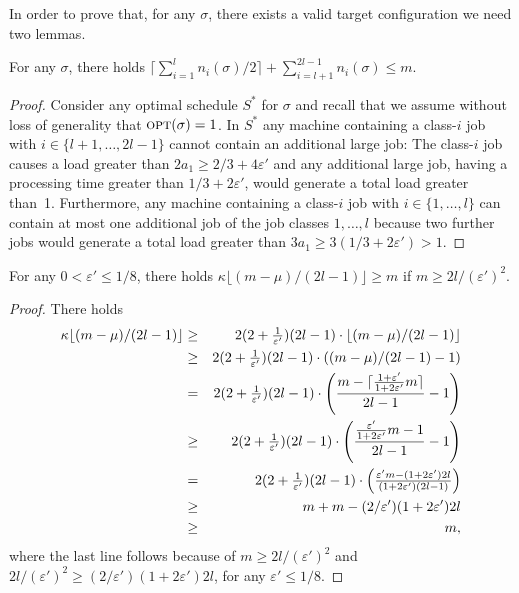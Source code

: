 \documentclass{llncs}
\newcommand{\OPT}{\text{{\sc opt}}}
\newcommand{\opt}{\OPT}
\newcommand{\eps}{\varepsilon}
\begin{document}
In order to prove that, for any $\sigma$, there exists a valid target configuration we need two lemmas.
\begin{lemma}\label{lem:jobs}
For any $\sigma$, there holds $\lceil \sum_{i=1}^l n_i(\sigma) / 2 \rceil + \sum_{i=l+1}^{2l-1} n_i(\sigma) \leq m$. 
\end{lemma}
\begin{proof}
Consider any optimal schedule $S^*$ for $\sigma$ and recall that we assume without loss of generality that
$\opt(\sigma)=1$. In $S^*$ any machine containing a class-$i$ job with $i\in \{l+1, \ldots, 2l-1\}$ cannot
contain an additional large job: The class-$i$ job causes a load greater than $2a_1 \geq 2/3+4\eps'$ and
any additional large job, having a processing time greater than $1/3+2\eps'$, would generate a total load
greater than~1. Furthermore, any machine containing a class-$i$ job with $i\in \{1,\ldots, l\}$ can
contain at most one additional job of the job classes $1, \ldots, l$ because two further jobs 
would generate a total load greater than $3a_1 \geq 3(1/3+2\eps') >1$. \hspace*{\fill}{$\Box$}
\end{proof}

\begin{lemma}\label{lem:kappa}
For any $0<\eps'\leq 1/8$, there holds $\kappa \lfloor (m-\mu)/(2l-1)\rfloor \geq m$ if $m\geq 2l/(\eps')^2$. 
\end{lemma}
\begin{proof}
There holds
\begin{eqnarray*}
\kappa \lfloor (m-\mu)/(2l-1)\rfloor &\geq 
 & 2 \textstyle{(2+\frac{1}{\eps'})} (2l-1)   \cdot    \lfloor    (m-\mu)/(2l-1) \rfloor   \\
 & \geq & 2 \textstyle{(2+\frac{1}{\eps'})}  (2l-1)  \cdot   (  (m-\mu)/(2l-1)  -1  )   \notag \\
& = & 2 \textstyle{(2+\frac{1}{\eps'})}  (2l-1)   \cdot \left (  \dfrac {m-\lceil \frac{1+\eps'}{1+2\eps'}m  \rceil }{ 2l-1 } -1  \right)     \notag  \\
&  \geq & 2 \textstyle{(2+\frac{1}{\eps'})}  (2l-1) \cdot \left (  \dfrac {  \frac{\eps'}{1+2\eps'}m  -1 }{ 2l-1 } -1  \right)    \notag  \\ 
& = & 2 \textstyle{(2+\frac{1}{\eps'})} (2l-1)  \cdot \left ( \frac { \eps'm  - (1+2\eps')2l }{(1+2\eps')(2l-1)} \right) \notag \\
&\geq & m + m - (2/\eps')(1+2\eps') 2l \notag \\
& \geq & m, \notag
\end{eqnarray*}
where the last line follows because of $m \geq 2l/(\eps')^2$ and $2l/(\eps')^2 \geq (2/\eps')(1+ 2\eps') 2l$, for
any $\eps'\leq 1/8$. \hspace*{\fill}{$\Box$}
\end{proof}
\end{document}
